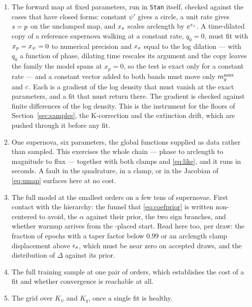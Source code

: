 \documentclass[11pt]{article}
\theoremstyle{plain}
\begin{document}
\begin{enumerate}
\item The forward map at fixed parameters, run in \texttt{Stan} itself, checked against
  the cases that have closed forms: constant $\psi'$ gives a circle, a unit rate gives
  $s = p$ on the unclamped map, and $x_{s}$ scales arclength by $e^{x_{s}}$.
  A time-dilated copy of a reference supernova walking at a constant rate, $q_{0} = 0$, must
  fit with $x_p = x_{\psi} = 0$ to numerical precision and $x_{s}$ equal to the log
  dilation --- with $q_{0}$ a function of phase, dilating time rescales its argument and
  the copy leaves the family the model spans at $x_p = 0$, so the test is exact only for
  a constant rate --- and a constant vector added to both bands must move only
  $m_{g}^{\max}$ and $c$. Each is a gradient of the log density that must vanish at the
  exact parameters, and a fit that must return there. The gradient is checked against
  finite differences of the log density. This is the instrument for the floors of
  Section~\ref{sec:samples}, the K-correction and the extinction drift, which are pushed
  through it before any fit.

\item One supernova, six parameters, the global functions supplied as data rather than
  sampled. This exercises the whole chain --- phase to arclength to magnitude to flux ---
  together with both clamps and \eqref{eq:like}, and it runs in seconds. A fault in the
  quadrature, in a clamp, or in the Jacobian of \eqref{eq:umap} surfaces here at no cost.

\item The full model at the smallest orders on a few tens of supernovae. First contact with
  the hierarchy: the funnel that \eqref{eq:coefprior} is written non-centered to avoid, the
  $\alpha$ against their prior, the two sign branches, and whether warmup arrives from the
  \salt-placed start. Read here too, per draw: the fraction of epochs with a taper factor
  below $0.99$ or an arclength clamp displacement above $\epsilon_{s}$, which must be
  near zero on accepted draws, and the distribution of $\Delta$ against its prior.

\item The full training sample at one pair of orders, which establishes the cost of a fit
  and whether convergence is reachable at all.

\item The grid over $K_{\psi}$ and $K_{q}$, once a single fit is healthy.
\end{enumerate}
\end{document}
